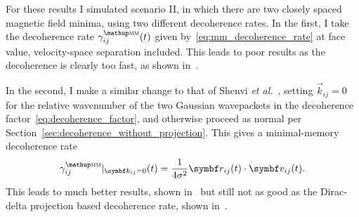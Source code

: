 For these results I simulated scenario II, in which there are two closely spaced magnetic field minima, using two different decoherence rates. In the first, I take the decoherence rate $\gamma^\up{\textsc{mm}}_{ij}(t)$ given by~\eqref{eq:mm_decoherence_rate} at face value, velocity-space separation included. This leads to poor results as the decoherence is clearly too fast, as shown in~.

In the second, I make a similar change to that of Shenvi \emph{et al.}~\cite{doi:10.1063/1.3575588}, setting $\vec k_{ij} = 0$ for the relative wavenumber of the two Gaussian wavepackets in the decoherence factor~\eqref{eq:decoherence_factor}, and otherwise proceed as normal per Section~\ref{sec:decoherence_without_projection}. This gives a minimal-memory decoherence rate
\begin{align}
\gamma^\up{\textsc{mm}}_{ij}|_{\vec k_{ij} = 0}(t) = \frac{1}{4\sigma^2}\vec r_{ij}(t)\cdot\vec v_{ij}(t).
\end{align}
This leads to much better results, shown in~ but still not as good as the Dirac-delta projection based decoherence rate, shown in~. 

